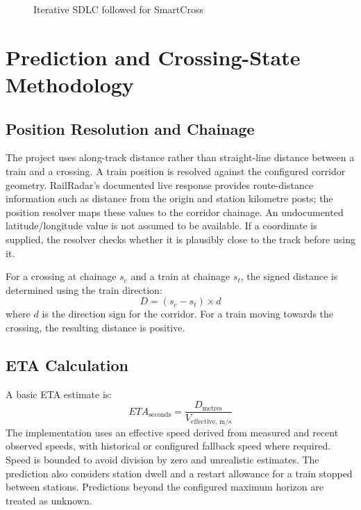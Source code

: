 \documentclass[11pt,a4paper]{report}
\begin{document}
\begin{figure}[H]\centering
{}
\caption{Iterative SDLC followed for SmartCross}
\label{fig:sdlc}
\end{figure}

\chapter{Prediction and Crossing-State Methodology}
\section{Position Resolution and Chainage}
The project uses along-track distance rather than straight-line distance between a train and a crossing. A train position is resolved against the configured corridor geometry. RailRadar's documented live response provides route-distance information such as distance from the origin and station kilometre posts; the position resolver maps these values to the corridor chainage. An undocumented latitude/longitude value is not assumed to be available. If a coordinate is supplied, the resolver checks whether it is plausibly close to the track before using it.

For a crossing at chainage $s_c$ and a train at chainage $s_t$, the signed distance is determined using the train direction:
\[
D = (s_c-s_t)\times d
\]
where $d$ is the direction sign for the corridor. For a train moving towards the crossing, the resulting distance is positive.

\section{ETA Calculation}
A basic ETA estimate is:
\[
ETA_{\text{seconds}} = \frac{D_{\text{metres}}}{V_{\text{effective, m/s}}}
\]
The implementation uses an effective speed derived from measured and recent observed speeds, with historical or configured fallback speed where required. Speed is bounded to avoid division by zero and unrealistic estimates. The prediction also considers station dwell and a restart allowance for a train stopped between stations. Predictions beyond the configured maximum horizon are treated as unknown.
\end{document}

